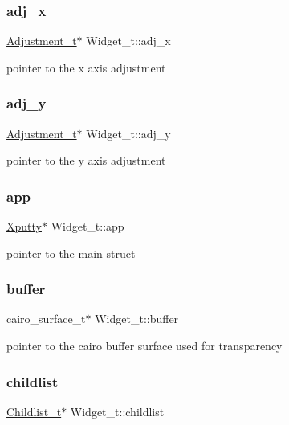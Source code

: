 \subsubsection{\texorpdfstring{adj\+\_\+x}{adj\_x}}
{\footnotesize\ttfamily \hyperlink{structAdjustment__t}{Adjustment\+\_\+t}$\ast$ Widget\+\_\+t\+::adj\+\_\+x}

pointer to the x axis adjustment \mbox{\label{structWidget__t_abde95d3fb49faff5dd852f16810115e7}} 
\subsubsection{\texorpdfstring{adj\+\_\+y}{adj\_y}}
{\footnotesize\ttfamily \hyperlink{structAdjustment__t}{Adjustment\+\_\+t}$\ast$ Widget\+\_\+t\+::adj\+\_\+y}

pointer to the y axis adjustment \mbox{\label{structWidget__t_a06eaa5b134c47983fd965e745cdbaa3b}} 
\subsubsection{\texorpdfstring{app}{app}}
{\footnotesize\ttfamily \hyperlink{structXputty}{Xputty}$\ast$ Widget\+\_\+t\+::app}

pointer to the main struct \mbox{\label{structWidget__t_a84d225e7b261d67daa764b47c8c62107}} 
\subsubsection{\texorpdfstring{buffer}{buffer}}
{\footnotesize\ttfamily cairo\+\_\+surface\+\_\+t$\ast$ Widget\+\_\+t\+::buffer}

pointer to the cairo buffer surface used for transparency \mbox{\label{structWidget__t_ac203ccbc58958a7c205897d4aba197e9}} 
\subsubsection{\texorpdfstring{childlist}{childlist}}
{\footnotesize\ttfamily \hyperlink{structChildlist__t}{Childlist\+\_\+t}$\ast$ Widget\+\_\+t\+::childlist}

